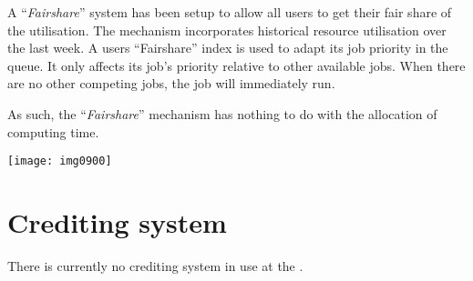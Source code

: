 A ``\emph{Fairshare}'' system has been setup to allow all users to get their
fair share of the \hpcname utilisation.  The mechanism incorporates historical
resource utilisation over the last week.  A users ``Fairshare'' index is used
to adapt its job priority in the queue.  It only affects its job's priority
relative to other available jobs. When there are no other competing jobs, the
job will immediately run.

As such, the ``\emph{Fairshare}'' mechanism has nothing to do with the
allocation of computing time.

\texttt{[image: img0900]}

\section{Crediting system}

There is currently no crediting system in use at the \hpc.
